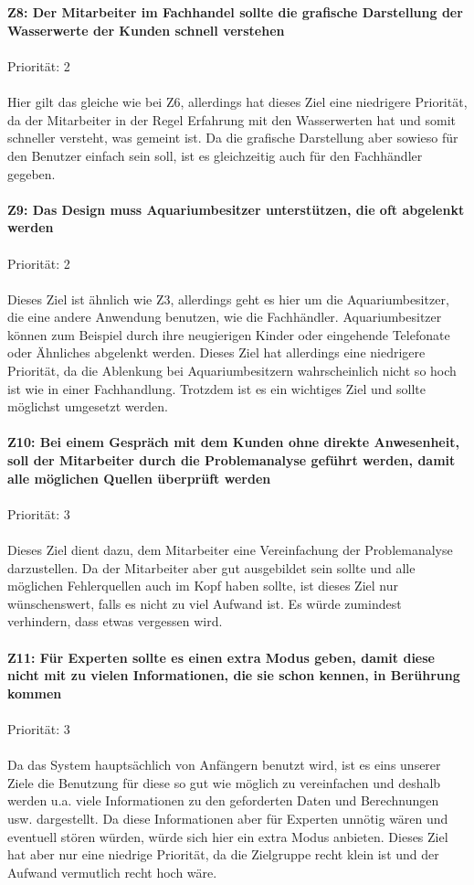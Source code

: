 \\ \\
\textbf{Z8: Der Mitarbeiter im Fachhandel sollte die grafische Darstellung der Wasserwerte der Kunden schnell verstehen}
\\ \\
Priorität: 2
\\ \\
Hier gilt das gleiche wie bei Z6, allerdings hat dieses Ziel eine niedrigere Priorität, da der Mitarbeiter in der Regel Erfahrung mit den Wasserwerten hat und somit schneller versteht, was gemeint ist. Da die grafische Darstellung aber sowieso für den Benutzer einfach sein soll, ist es gleichzeitig auch für den Fachhändler gegeben.
\\ \\
\textbf{Z9: Das Design muss Aquariumbesitzer unterstützen, die oft abgelenkt werden}
\\ \\
Priorität: 2
\\ \\
Dieses Ziel ist ähnlich wie Z3, allerdings geht es hier um die Aquariumbesitzer, die eine andere Anwendung benutzen, wie die Fachhändler. Aquariumbesitzer können zum Beispiel durch ihre neugierigen Kinder oder eingehende Telefonate oder Ähnliches abgelenkt werden. Dieses Ziel hat allerdings eine niedrigere Priorität, da die Ablenkung bei Aquariumbesitzern wahrscheinlich nicht so hoch ist wie in einer Fachhandlung. Trotzdem ist es ein wichtiges Ziel und sollte möglichst umgesetzt werden.
\\ \\
\textbf{Z10: Bei einem Gespräch mit dem Kunden ohne direkte Anwesenheit, soll der Mitarbeiter durch die Problemanalyse geführt werden, damit alle möglichen Quellen überprüft werden}
\\ \\
Priorität: 3
\\ \\
Dieses Ziel dient dazu, dem Mitarbeiter eine Vereinfachung der Problemanalyse darzustellen. Da der Mitarbeiter aber gut ausgebildet sein sollte und alle möglichen Fehlerquellen auch im Kopf haben sollte, ist dieses Ziel nur wünschenswert, falls es nicht zu viel Aufwand ist. Es würde zumindest verhindern, dass etwas vergessen wird.
\\ \\
\textbf{Z11: Für Experten sollte es einen extra Modus geben, damit diese nicht mit zu vielen Informationen, die sie schon kennen, in Berührung kommen}
\\ \\
Priorität: 3
\\ \\
Da das System hauptsächlich von Anfängern benutzt wird, ist es eins unserer Ziele die Benutzung für diese so gut wie möglich zu vereinfachen und deshalb werden u.a. viele Informationen zu den geforderten Daten und Berechnungen usw. dargestellt. Da diese Informationen aber für Experten unnötig wären und eventuell stören würden, würde sich hier ein extra Modus anbieten. Dieses Ziel hat aber nur eine niedrige Priorität, da die Zielgruppe recht klein ist und der Aufwand vermutlich recht hoch wäre.

